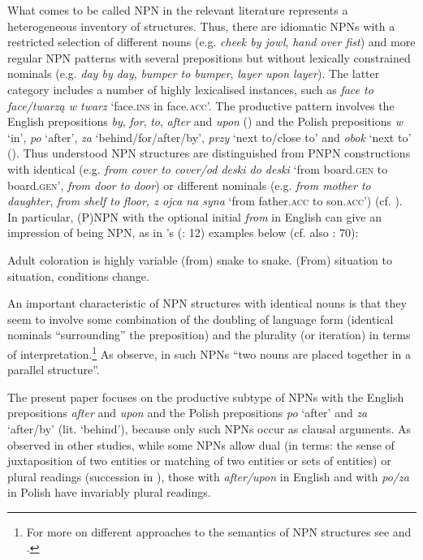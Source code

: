 \documentclass[output=paper]{langscibook}
\begin{document}
What comes to be called NPN in the relevant literature represents a heterogeneous inventory of structures. Thus, there are idiomatic NPNs with a restricted selection of different nouns (e.g. \textit{cheek by jowl}, \textit{hand over fist}) and more regular NPN patterns with several prepositions but without lexically constrained nominals (e.g. \textit{day by day}, \textit{bumper to bumper}, \textit{layer upon layer}). The latter category includes a number of highly lexicalised instances, such as \textit{face to face/twarzą w twarz} ‘face.\textsc{ins} in face.\textsc{acc}’. The productive pattern involves the English prepositions \textit{by}, \textit{for}, \textit{to}, \textit{after} and \textit{upon} (\citealt{Pi1995,Jackendoff2008}) and the Polish prepositions \textit{w} ‘in’, \textit{po} ‘after’, \textit{za} ‘behind/for/after/by’, \textit{przy} ‘next to/close to’ and \textit{obok} ‘next to’ (\citealt{Rosalska2011,Pskit2015,Dobaczewski2018}). Thus understood NPN structures are distinguished from PNPN constructions with identical (e.g. \textit{from cover to cover/od deski do deski} ‘from board.\textsc{gen} to board.\textsc{gen}’, \textit{from door to door}) or different nominals (e.g. \textit{from mother to daughter}, \textit{from shelf to floor, z ojca na syna }‘from father.\textsc{acc} to son.\textsc{acc}’) (cf. \citealt{Zwarts2013}). In particular, (P)NPN with the optional initial \textit{from} in English can give an impression of being NPN, as in \citeauthor{Jackendoff2008}’s (\citeyear{Jackendoff2008}: 12) examples below (cf. also \citealt{Zwarts2013}: 70):

\ea\label{psk:ex:1} \ea Adult coloration is highly variable (from) snake to snake.
\ex (From) situation to situation, conditions change.
\z\z

\noindent An important characteristic of NPN structures with identical nouns is that they seem to involve some combination of the doubling of language form (identical nominals ``surrounding'' the preposition) and the plurality (or iteration) in terms of interpretation.\footnote{For more on different approaches to the semantics of NPN structures see \citet{Beck.Stechow2007} and \citet{Jackendoff2008}.} As \citet[280]{Quirk.etal1985} observe, in such NPNs “two nouns are placed together in a parallel structure”.

The present paper focuses on the productive subtype of NPNs with the English prepositions \textit{after} and \textit{upon} and the Polish prepositions \textit{po} ‘after’ and \textit{za} ‘after/by’ (lit. ‘behind’), because only such NPNs occur as clausal arguments. As observed in other studies, while some NPNs allow dual (in  terms: the sense of juxtaposition of two entities or matching of two entities or sets of entities) or plural readings (succession in \citealt{Jackendoff2008}), those with \textit{after/upon} in English and with \textit{po/za} in Polish have invariably plural readings.
\end{document}
